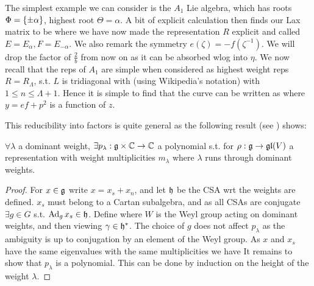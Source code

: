 \documentclass{article}
\begin{document}
\begin{example}
	The simplest example we can consider is the $A_1$ Lie algebra, which has roots $\Phi = \left\{ \pm \alpha \right\}$, highest root $\Theta=\alpha$. A bit of explicit calculation then finds our Lax matrix to be 
where we have now made the representation $R$ explicit and called $E = E_\alpha, F = E_{-\alpha}$. We also remark the symmetry $e(\zeta) = -f(\zeta^{-1})$. We will drop the factor of $\frac{2}{b}$ from now on as it can be absorbed wlog into $\eta$. We now recall that the reps of $A_1$ are simple when considered as highest weight reps $R=R_\Lambda$, s.t. $L$ is tridiagonal with (using Wikipedia's notation)
with $1 \leq n \leq \Lambda+1$. Hence it is simple to find that the curve can be written as 
where $y = ef+p^2$ is a function of $z$.
\end{example}

This reducibility into factors is quite general as the following result (see \cite{McDaniel1992}) shows: 
\begin{prop}
	$\forall \lambda$ a dominant weight, $\exists p_\lambda : \mathfrak{g} \times \mathbb{C} \to \mathbb{C}$ a polynomial s.t. for $\rho:\mathfrak{g} \to \mathfrak{gl}(V)$ a representation with weight multiplicities $m_\lambda$ 
where $\lambda$ runs through dominant weights. 
\end{prop}
\begin{proof}
	For $x \in \mathfrak{g}$ write $x=x_s + x_n$, and let $\mathfrak{h}$ be the CSA wrt the weights are defined. $x_s$ must belong to a Cartan subalgebra, and as all CSAs are conjugate $\exists g \in G$ s.t. $\operatorname{Ad}_g x_s \in \mathfrak{h}$. Define 
where $W$ is the Weyl group acting on dominant weights, and then viewing $\gamma \in \mathfrak{h}^\ast$. The choice of $g$ does not affect $p_\lambda$ as the ambiguity is up to conjugation by an element of the Weyl group. As $x$ and $x_s$ have the same eigenvalues with the same multiplicities we have 
It remains to show that $p_\lambda$ is a polynomial. This can be done by induction on the height of the weight $\lambda$.  
\end{proof}
\end{document}

